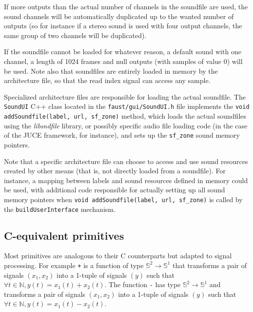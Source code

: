 If more outputs than the actual number of channels in the soundfile are used, the sound channels will be automatically duplicated up to the wanted number of outputs (so for instance if a stereo sound is used with four output channels, the same group of two channels will be duplicated).

If the soundfile cannot be loaded for whatever reason, a default sound with one channel, a length of 1024 frames and null outputs (with samples of value 0) will be used. Note also that soundfiles are entirely loaded in memory by the architecture file, so that the read index signal can access any sample.

Specialized architecture files are responsible for loading the actual soundfile. The \lstinline'SoundUI' C++ class located in the \lstinline'faust/gui/SoundUI.h' file implements the \lstinline'void addSoundfile(label, url, sf_zone)' method, which loads the actual soundfiles using the {\it libsndfile} library, or possibly specific audio file loading code (in the case of the JUCE framework, for instance), and sets up the \lstinline'sf_zone' sound memory pointers.

Note that a specific architecture file can choose to access and use sound resources created by other means (that is, not directly loaded from a soundfile). For instance, a mapping between labels and sound resources defined in memory could be used, with additional code responsible for actually setting up all sound memory pointers when \lstinline'void addSoundfile(label, url, sf_zone)' is called by the \lstinline'buildUserInterface' mechanism.

\subsection{C-equivalent primitives}

Most \faust primitives are analogous to their C counterparts but adapted to signal processing.
For example \lstinline|+| is a function of type $\mathbb{S}^{2}\rightarrow\mathbb{S}^{1}$ that transforms a pair of signals $(x_1,x_2)$ into a 1-tuple of signals $(y)$ such that $\forall t\in\mathbb{N}, y(t)=x_{1}(t)+x_{2}(t)$. The function \lstinline|-| has type $\mathbb{S}^{2}\rightarrow\mathbb{S}^{1}$ and transforms a pair of signals $(x_1,x_2)$ into a 1-tuple of signals $(y)$ such that $\forall t\in\mathbb{N}, y(t)=x_{1}(t)-x_{2}(t)$.

